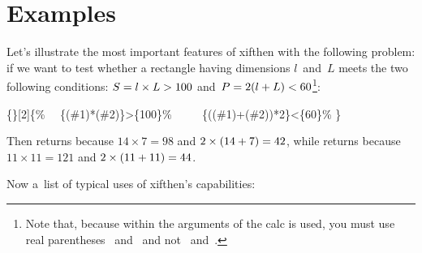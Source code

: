 \documentclass{article}
\makeatletter
\newcommand*{\1}{$_1\m@th$}
\newcommand*{\2}{$_2\m@th$}
\newcommand*{\pack}{\textsf}
\makeatother
\begin{document}
\section{Examples}

Let's illustrate the most important features of \pack{xifthen} with
the following problem: if we want to test whether a rectangle having
dimensions $l$~and~$L$ meets the two following conditions: $S = l
\times\nobreak L > 100$ and~$P = 2 (l +\nobreak L) < 60$\footnote{Note
  that, because within the arguments of  the \pack{calc}
  is used, you must use real parentheses \tex{(}~and~\tex{)} and not
  \cmd{(}~and~\cmd{)}.}:
%
\begin{texcode}
\{\}[2]\{\%\newline
\ \ \{(\#1)*(\#2)\}>\{100\}\%\newline
\ \ \newline
\ \ \{((\#1)+(\#2))*2\}<\{60\}\%\newline
\}
\end{texcode}
%
Then 
returns  because $14\times 7 =
98$ and $2\times (14 +\nobreak 7) = 42$, while
 returns  because
$11 \times 11 = 121$ and $2\times (11 +\nobreak 11) = 44$.

\bigbreak

Now a~list of typical uses of \pack{xifthen}'s capabilities:
\end{document}
